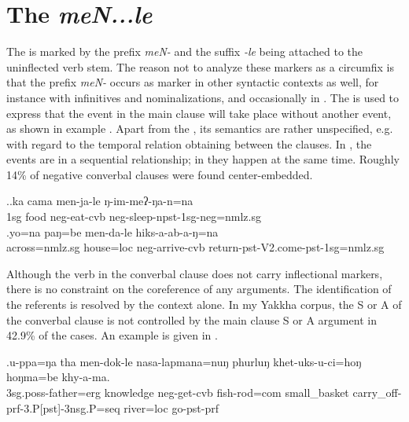 	
\section{The  \emph{meN...le}}\label{menle}

The  is marked by the prefix \emph{meN-} and the suffix \emph{-le} being attached to the uninflected verb stem. The reason not to analyze these markers as a circumfix is that the prefix \emph{meN-} occurs as  marker in other syntactic contexts as well, for instance with infinitives and nominalizations, and occasionally in . The  is used to express that the event in the main clause will take place without another event, as shown in example \Next. Apart from the , its semantics are rather unspecified, e.g. with regard to the temporal relation obtaining between the clauses. In \Next, the events are in a sequential relationship; in \NNext they happen at the same time. Roughly 14\% of negative converbal clauses were found center-embedded.
	
	\ex.\ag.\label{menjale}ka cama men-ja-le ŋ-im-meʔ-ŋa-n=na\\
	{\sc 1sg} food   {\sc neg-}eat{\sc -cvb} {\sc neg-}sleep{\sc -npst-1sg-neg=nmlz.sg}\\
	\bg.yo=na paŋ=be men-da-le hiks-a-ab-a-ŋ=na\\
across{\sc =nmlz.sg} house{\sc =loc} {\sc neg}-arrive-{\sc cvb} return{\sc -pst-V2.come-pst-1sg=nmlz.sg}\\

Although the verb in the converbal clause does not carry inflectional markers, there is no constraint on the coreference of any arguments. The identification of the referents is resolved by the context alone. In my Yakkha corpus, the S or A of the converbal clause is not controlled by the main clause S or A argument in  42.9\% of the cases. An example is given in \Next.

\exg.u-ppa=ŋa tha men-dok-le nasa-lapmana=nuŋ phurluŋ khet-uks-u-ci=hoŋ hoŋma=be    khy-a-ma.\\
	{\sc 3sg.poss-}father={\sc erg} knowledge {\sc neg}-get-{\sc cvb} fish-rod{\sc =com}  small\_basket carry\_off{\sc -prf-3.P[pst]-3nsg.P=seq} river={\sc loc} go{\sc [3sg]-pst-prf}\\
		 

